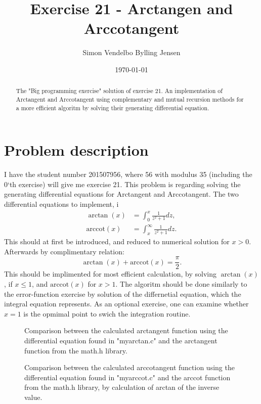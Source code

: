 \documentclass[twocolumn]{article}
\begin{document}
\title{Exercise 21 - Arctangen and Arccotangent}
\author{Simon Vendelbo Bylling Jensen}
\date{\today}
\maketitle

\begin{abstract}
The "Big programming exercise" solution of exercise 21. An implementation of Arctangent and Arccotangent using complementary and mutual recursion methods for a more efficient algoritm by solving their generating differential equation. 
\end{abstract}

\section{Problem description}
I have the student number 201507956, where 56 with modulus 35 (including the 0`th exercise) will give me exercise 21. This problem is regarding solving the generating differential equations for Arctangent and Arccotangent. The two differential equations to implement, i
\begin{align}
\arctan(x) &= \int_0^x \frac{1}{z^2 + 1} dz, \label{eq:arctan}\\
\mathrm{arccot}(x) &= \int_x^\infty \frac{1}{z^2 + 1} dz. \label{eq:arccot} 
\end{align}
This should at first be introduced, and reduced to numerical solution for $x > 0$. Afterwards by complimentary relation:
\begin{equation}
\arctan(x) + \mathrm{arccot}(x) = \frac{\pi}{2}.\label{eq:sumrelation}
\end{equation}
This should be implimented for most efficient calculation, by solving $\arctan(x)$, if $x \leq 1$, and $\mathrm{arccot}(x)$ for $x>1$. The algoritm should be done similarly to the error-function exercise by solution of the differnetial equation, which the integral equation represents. As an optional exercise, one can examine whether $x=1$ is the opmimal point to swich the integration routine.


\begin{figure}

\caption{Comparison between the calculated arctangent function using the differential equation found in "myarctan.c" and the arctangent function from the math.h library.}
\label{fig-atan}
\end{figure}

\begin{figure}

\caption{Comparison between the calculated arccotangent function using the differential equation found in "myarccot.c" and the arccot function from the math.h library, by calculation of arctan of the inverse value.}
\label{fig-acot}
\end{figure}
\end{document}
